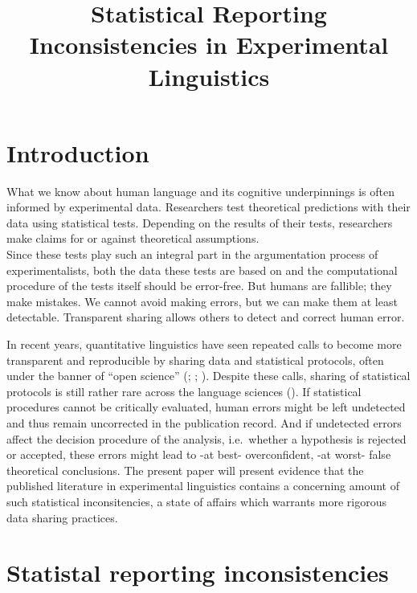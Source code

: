 \documentclass[
  doc,
  longtable,
  nolmodern,
  notxfonts,
  notimes,
  colorlinks=true,linkcolor=blue,citecolor=blue,urlcolor=blue]{apa7}
\title{Statistical Reporting Inconsistencies in Experimental
Linguistics}
\affiliation{
{Department of Linguistics \& Scandinavian Studies, University of Oslo}}
\begin{document}
\maketitle


\setcounter{secnumdepth}{5}

\setlength\LTleft{0pt}


\section{Introduction}\label{introduction}

What we know about human language and its cognitive underpinnings is
often informed by experimental data. Researchers test theoretical
predictions with their data using statistical tests. Depending on the
results of their tests, researchers make claims for or against
theoretical assumptions.\\
Since these tests play such an integral part in the argumentation
process of experimentalists, both the data these tests are based on and
the computational procedure of the tests itself should be error-free.
But humans are fallible; they make mistakes. We cannot avoid making
errors, but we can make them at least detectable. Transparent sharing
allows others to detect and correct human error.

In recent years, quantitative linguistics have seen repeated calls to
become more transparent and reproducible by sharing data and statistical
protocols, often under the banner of ``open science''
(;
;
). Despite these
calls, sharing of statistical protocols is still rather rare across the
language sciences (). If statistical procedures cannot be critically evaluated,
human errors might be left undetected and thus remain uncorrected in the
publication record. And if undetected errors affect the decision
procedure of the analysis, i.e.~whether a hypothesis is rejected or
accepted, these errors might lead to -at best- overconfident, -at worst-
false theoretical conclusions. The present paper will present evidence
that the published literature in experimental linguistics contains a
concerning amount of such statistical inconsitencies, a state of affairs
which warrants more rigorous data sharing practices.

\section{Statistal reporting
inconsistencies}\label{statistal-reporting-inconsistencies}
\end{document}
